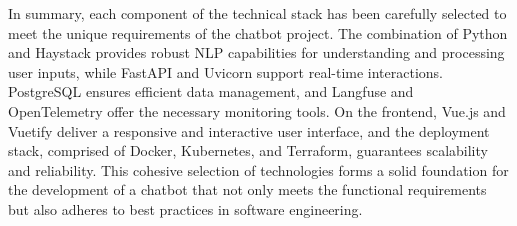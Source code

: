 \vspace{1cm}

In summary, each component of the technical stack has been carefully selected to meet the unique requirements of the chatbot project. The combination of Python and Haystack provides robust NLP capabilities for understanding and processing user inputs, while FastAPI and Uvicorn support real-time interactions. PostgreSQL ensures efficient data management, and Langfuse and OpenTelemetry offer the necessary monitoring tools. On the frontend, Vue.js and Vuetify deliver a responsive and interactive user interface, and the deployment stack, comprised of Docker, Kubernetes, and Terraform, guarantees scalability and reliability. This cohesive selection of technologies forms a solid foundation for the development of a chatbot that not only meets the functional requirements but also adheres to best practices in software engineering.
